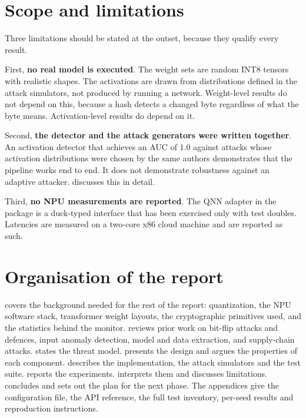 \section{Scope and limitations}

Three limitations should be stated at the outset, because they qualify every result.

First, \textbf{no real model is executed}. The weight sets are random INT8 tensors with
realistic shapes. The activations are drawn from distributions defined in the attack
simulators, not produced by running a network. Weight-level results do not depend on this,
because a hash detects a changed byte regardless of what the byte means. Activation-level
results do depend on it.

Second, \textbf{the detector and the attack generators were written together}. An activation
detector that achieves an AUC of 1.0 against attacks whose activation distributions were chosen
by the same authors demonstrates that the pipeline works end to end. It does not demonstrate
robustness against an adaptive attacker.  discusses this in detail.

Third, \textbf{no NPU measurements are reported}. The QNN adapter in the package is a
duck-typed interface that has been exercised only with test doubles. Latencies are measured on
a two-core x86 cloud machine and are reported as such.

\section{Organisation of the report}

 covers the background needed for the rest of the report: quantization,
the NPU software stack, transformer weight layouts, the cryptographic primitives used, and the
statistics behind the monitor.  reviews prior work on bit-flip attacks and
defences, input anomaly detection, model and data extraction, and supply-chain attacks.
 states the threat model.  presents the design and argues the
properties of each component.  describes the implementation, the
attack simulators and the test suite.  reports the experiments.
 interprets them and discusses limitations.  concludes
and sets out the plan for the next phase. The appendices give the configuration file, the API
reference, the full test inventory, per-seed results and reproduction instructions.
